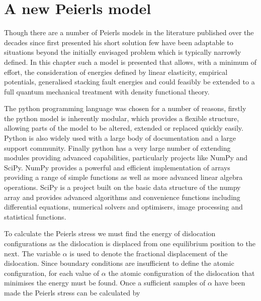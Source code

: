 
\chapter{A new Peierls model}

\graphicspath{{Chapter2/Figs/}}


Though there are a number \cite{Nabarro1947,Huntington1955, puls1976, Vitek1992,  Bulatov1997, Lubarda2007, Clegg2006,Gouriet2015} of Peierls models in the literature published over the decades since \citet{Peierls1940} first presented his short solution few have been adaptable to situations beyond the initially envisaged problem which is typically narrowly defined. In this chapter such a model is presented that allows, with a minimum of effort, the consideration of energies defined by linear elasticity, empirical potentials, generalised stacking fault energies and could feasibly be extended to a full quantum mechanical treatment with density functional theory.

The python programming language was chosen for a number of reasons, firstly the python model is inherently modular, which provides a flexible structure, allowing parts of the model to be altered, extended or replaced quickly easily. Python is also widely used with a large body of documentation and a large support community. Finally python has a very large number of extending modules providing advanced capabilities, particularly projects like NumPy and SciPy. NumPy provides a powerful and efficient implementation of arrays providing a range of simple functions as well as more advanced linear algebra operations. SciPy is a project built on the basic data structure of the numpy array and provides advanced algorithms and convenience functions including differential equations, numerical solvers and optimisers, image processing and statistical functions.


To calculate the Peierls stress we must find the energy of dislocation configurations as the dislocation is displaced from one equilibrium position to the next. The variable $\alpha$ is used to denote the fractional displacement of the dislocation. Since boundary conditions are insufficient to define the atomic configuration, for each value of $\alpha$ the atomic configuration of the dislocation that minimises the energy must be found. Once a sufficient samples of $\alpha$ have been made the Peierls stress can be calculated by 

